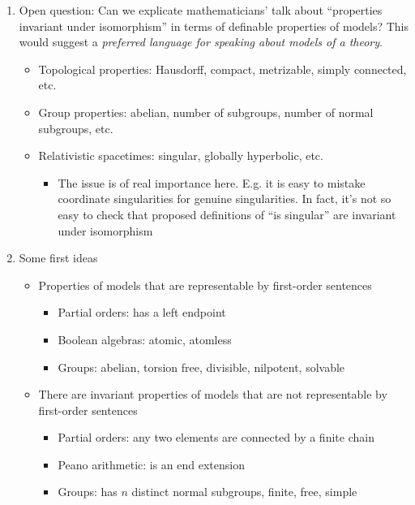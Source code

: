 \documentclass[fleqn]{tufte-handout}
\begin{document}
\begin{enumerate}
\begin{itemize}
\begin{itemize}
    \item Example: $(\mathbb{R},\leq )$ and $(\mathbb{Q},\leq )$ are
      elementarily equivalent.
    \item Recall: In the case of finite structures, elementary
      equivalence implies isomorphism.
    \end{itemize}
  \end{itemize}

\item Open question: Can we explicate mathematicians' talk about
  ``properties invariant under isomorphism'' in terms of definable
  properties of models? This would suggest a \emph{preferred language
    for speaking about models of a theory}.
  \begin{itemize}
  \item Topological properties: Hausdorff, compact, metrizable, simply
    connected, etc.
  \item Group properties: abelian, number of subgroups, number of
    normal subgroups, etc.
  \item Relativistic spacetimes: singular, globally hyperbolic,
    etc.
    \begin{itemize}
    \item The issue is of real importance here. E.g. it is easy to
      mistake coordinate singularities for genuine singularities. In
      fact, it's not so easy to check that proposed definitions of
      ``is singular'' are invariant under
      isomorphism \end{itemize} \end{itemize}


\item Some first ideas
  \begin{itemize}
  \item Properties of models that are representable by first-order
    sentences
    \begin{itemize}
    \item Partial orders: has a left endpoint
    \item Boolean algebras: atomic, atomless
    \item Groups: abelian, torsion free, divisible, nilpotent,
      solvable
    \end{itemize}
  \item There are invariant properties of models that are not
    representable by first-order sentences
    \begin{itemize}
    \item Partial orders: any two elements are connected by a finite
      chain
    \item Peano arithmetic: is an end extension
    \item Groups: has $n$ distinct normal subgroups, finite, free,
      simple
    \end{itemize}
  \end{itemize}


\end{enumerate}
\end{document}
